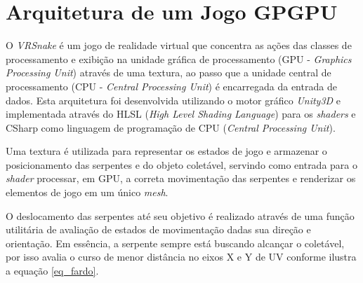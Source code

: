 \documentclass{SBCbookchapter}
\begin{document}

\section{Arquitetura de um Jogo GPGPU} \label{sec:architecture}
O \textit{VRSnake} é um jogo de realidade virtual que concentra as ações das classes de processamento e exibição na unidade gráfica de processamento (GPU - \textit{Graphics Processing Unit}) através de uma textura, ao passo que a unidade central de processamento (CPU - \textit{Central Processing Unit}) é encarregada da entrada de dados. Esta arquitetura foi desenvolvida utilizando o motor gráfico \textit{Unity3D} e implementada através do HLSL (\textit{High Level Shading Language}) para os \textit{shaders} e CSharp como linguagem de programação de CPU (\textit{Central Processing Unit}).

Uma textura é utilizada para representar os estados de jogo e armazenar o posicionamento das serpentes e do objeto coletável, servindo como entrada para o \textit{shader} processar, em GPU, a correta movimentação das serpentes e renderizar os elementos de jogo em um único \textit{mesh}.

O deslocamento das serpentes até seu objetivo é realizado através de uma função utilitária de avaliação de estados de movimentação dadas sua direção e orientação. Em essência, a serpente sempre está buscando alcançar o coletável, por isso avalia o curso de menor distância no eixos X e Y de UV conforme ilustra a equação \ref{eq_fardo}.
\end{document}
